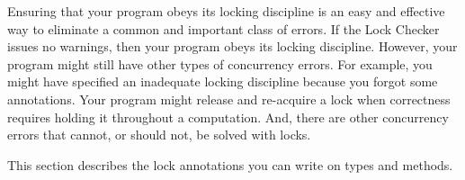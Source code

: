 Ensuring that your program obeys its locking discipline is an easy and
effective way to eliminate a common and important class of errors.
If the Lock Checker issues no warnings, then your program obeys its locking discipline.
However, your program might still have other types of concurrency errors.
%
For example, you might have specified an inadequate locking discipline
because you forgot some 
annotations.
%
Your program might release and
re-acquire a lock when correctness requires holding it throughout a
computation.
%
And, there are other concurrency errors that cannot, or
should not, be solved with locks.


This section describes the lock annotations you can write on types and methods.



